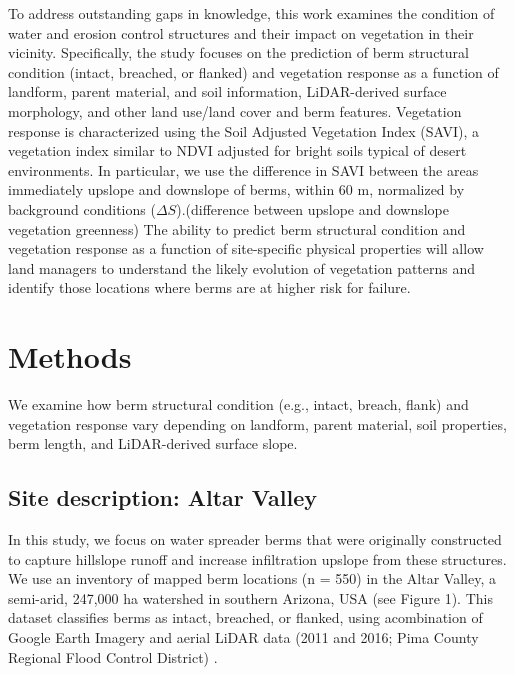 \documentclass[review]{elsarticle}
\begin{document}
To address outstanding gaps in knowledge, this work examines the condition of water and erosion control structures and their impact on vegetation in their vicinity. Specifically, the study focuses on the prediction of berm structural condition (intact, breached, or flanked) and vegetation response as a function of landform, parent material, and soil information, LiDAR-derived surface morphology, and other land use/land cover and berm features. 
Vegetation response is characterized using the Soil Adjusted Vegetation Index (SAVI), a vegetation index similar to NDVI adjusted for bright soils typical of desert environments. 
In particular, we use the difference in SAVI between the areas immediately upslope and downslope of berms, within 60 m, normalized by background conditions ($\Delta S$).(difference between upslope and downslope vegetation greenness) 
The ability to predict berm structural condition and vegetation response as a function of site-specific physical properties will allow land managers to understand the likely evolution of vegetation patterns and identify those locations where berms are at higher risk for failure. 


\section{Methods}

We examine  how berm structural condition (e.g., intact, breach, flank) and vegetation response vary depending on landform, parent material, soil properties, berm length, and LiDAR-derived surface slope. 


\subsection{Site description: Altar Valley}
\label{sec:Altar}

In this study, we focus on water spreader  berms that were originally constructed to capture hillslope runoff and increase infiltration upslope from these structures. We use an inventory of mapped berm locations (n = 550) in the  Altar Valley, a semi-arid, 247,000 ha watershed in southern Arizona, USA \cite{nichols2021landscape} (see Figure 1). This dataset  classifies berms as intact, breached, or flanked,  using acombination of Google Earth Imagery and aerial LiDAR data (2011 and 2016; Pima County Regional Flood Control District) \cite{nichols2018geomorphic}.
\end{document}
